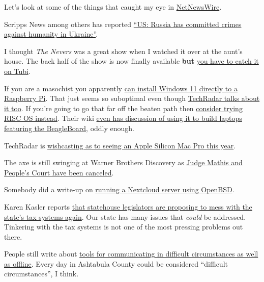 Let's look at some of the things that caught my eye in
\href{https://netnewswire.com/}{NetNewsWire}.

Scripps News among others has reported
\href{https://scrippsnews.com/stories/us-russia-has-committed-crimes-against-humanity-in-ukraine/}{``US:
Russia has committed crimes against humanity in Ukraine''}.

I thought \emph{The Nevers} was a great show when I watched it over at
the aunt's house. The back half of the show is now finally available
\textbf{but}
\href{https://www.polygon.com/23598491/the-nevers-season-1-free-online-unaired-episodes}{you
have to catch it on Tubi}.

If you are a masochist you apparently
\href{https://www.tomshardware.com/how-to/install-tiny11-for-arm64-on-raspberry-pi-4}{can
install Windows 11 directly to a Raspberry Pi}. That just seems so
suboptimal even though
\href{https://www.techradar.com/news/windows-11-on-raspberry-pi-its-possible-thanks-to-tiny11}{TechRadar
talks about it too}. If you're going to go that far off the beaten path
then
\href{https://www.riscosopen.org/wiki/documentation/show/GUI\%20comparison:\%20RISC\%20OS\%20vs\%20Windows\%20and\%20macOS}{consider
trying RISC OS instead}. Their wiki
\href{https://www.riscos.info/index.php/BeagleBoard-based_Laptop}{even
has discussion of using it to build laptops featuring the BeagleBoard},
oddly enough.

TechRadar is
\href{https://www.techradar.com/news/mac-pro-2023-its-now-or-never-apple-your-customers-are-waiting}{wishcasting
as to seeing an Apple Silicon Mac Pro this year}.

The axe is still swinging at Warner Brothers Discovery as
\href{https://variety.com/2023/tv/news/judge-mathis-the-peoples-court-canceled-warner-bros-1235527589/}{Judge
Mathis and People's Court have been canceled}.

Somebody did a write-up on
\href{https://x61.sh/log/2023/02/20230217T112354-nextcloud_openbsd.html}{running
a Nextcloud server using OpenBSD}.

Karen Kasler reports
\href{https://www.statenews.org/government-politics/2023-02-17/schools-ohio-governments-could-lose-over-a-billion-dollars-from-tax-changes-backed-by-speaker}{that
statehouse legislators are proposing to mess with the state's tax
systems again}. Our state has many issues that \emph{could} be
addressed. Tinkering with the tax systems is not one of the most
pressing problems out there.

People still write about
\href{https://www.complete.org/tools-for-communicating-offline-and-in-difficult-circumstances/}{tools
for communicating in difficult circumstances as well as offline}. Every
day in Ashtabula County could be considered ``difficult circumstances'',
I think.

